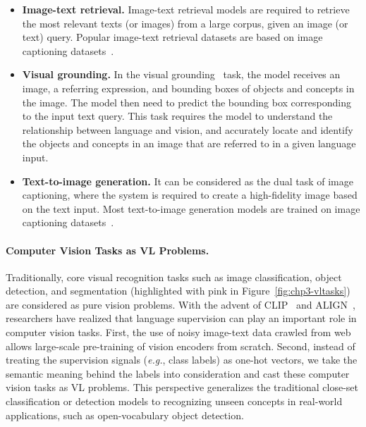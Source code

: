 \begin{itemize}[leftmargin=*]
        \item \textbf{Image-text retrieval.} Image-text retrieval models are required to retrieve the most relevant texts (or images) from a large corpus, given an image (or text) query. Popular image-text retrieval datasets are based on image captioning datasets~\citep{chen2015microsoftcoco, plummer2015flickr30k}. 
        
        \item \textbf{Visual grounding.} In the visual grounding~\citep{yu2016modeling,plummer2015flickr30k} task, the model receives an image, a referring expression, and bounding boxes of objects and concepts in the image. The model then need to predict the bounding box corresponding to the input text query. This task requires the model to understand the relationship between language and vision, and accurately locate and identify the objects and concepts in an image that are referred to in a given language input.  
        
        \item \textbf{Text-to-image generation.} It can be considered as the dual task of image captioning, where the system is required to create a high-fidelity image based on the text input. Most text-to-image generation models are trained on image captioning datasets~\citep{chen2015microsoftcoco, plummer2015flickr30k}.
    \end{itemize}
    
\paragraph{Computer Vision Tasks as VL Problems.}
Traditionally, core visual recognition tasks such as image classification, object detection, and segmentation (highlighted with pink in Figure~\ref{fig:chp3-vltasks}) are considered as pure vision problems. With the advent of CLIP~\citep{radford2021learning} and ALIGN~\citep{jia2021scaling}, researchers have realized that language supervision can play an important role in computer vision tasks. First, the use of noisy image-text data crawled from web allows large-scale pre-training of vision encoders from scratch. Second, instead of treating the supervision signals (\emph{e.g.}, class labels) as one-hot vectors, we take the semantic meaning behind the labels into consideration and cast these computer vision tasks as VL problems. This  perspective generalizes the traditional close-set classification or detection models to recognizing unseen concepts in real-world applications, such as open-vocabulary object detection.
    

